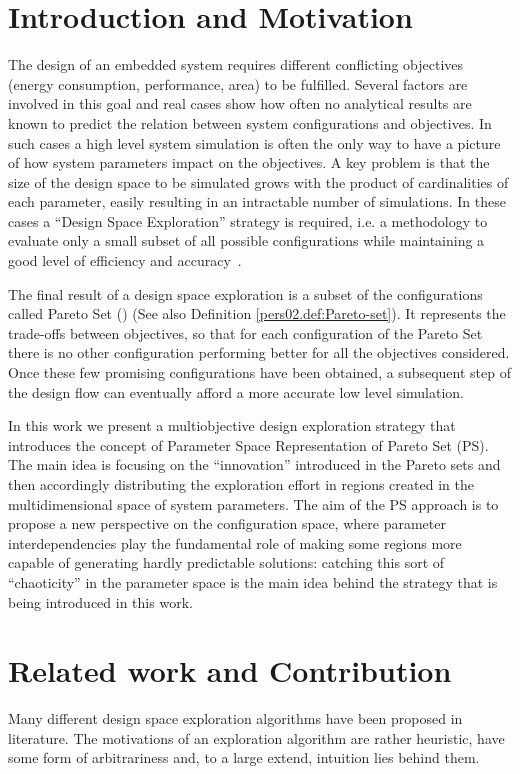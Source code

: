 
\section{Introduction and Motivation}


The design of an embedded system requires different conflicting
objectives (energy consumption, performance, area) to be fulfilled.
Several factors are involved in this goal and real cases show how
often no analytical results are known to predict the relation between
system configurations and objectives. In such cases a high level
system simulation is often the only way to have a picture of how system
parameters impact on the objectives.  A key problem is that the size
of the design space to be simulated grows with the product of
cardinalities of each parameter, easily resulting in an intractable number
of simulations. In these cases a ``Design Space
Exploration'' strategy is required, i.e. a methodology to evaluate
only a small subset of all possible configurations while maintaining a
good level of efficiency and accuracy~\cite{surviving_soc}.

The final result of a design space exploration is a subset of the
configurations called Pareto Set (\cite{pareto}) (See also Definition
\ref{pers02.def:Pareto-set}). It represents the trade-offs between
objectives, so that for each configuration of the Pareto Set there is no
other configuration performing better for all the objectives
considered. Once these few promising configurations have been obtained, a
subsequent step of the design flow can eventually afford a more
accurate low level simulation.

In this work we present a multiobjective design exploration strategy
that introduces the concept of Parameter Space Representation of
Pareto Set (PS). The main idea is focusing on the ``innovation''
introduced in the Pareto sets and then accordingly distributing the
exploration effort in regions created in the multidimensional space of
system parameters. The aim of the PS approach is to propose a new
perspective on the configuration space, where parameter
interdependencies play the fundamental role of making some regions
more capable of generating hardly predictable solutions: catching this
sort of ``chaoticity'' in the parameter space is the main idea behind
the strategy that is being introduced in this work.

\section{Related work and Contribution}
\label{sec:Related-work}
Many different design space exploration algorithms have been proposed
in literature.  The motivations of an exploration
algorithm are rather heuristic, have some form of arbitrariness and,
to a large extend, intuition lies behind them.


